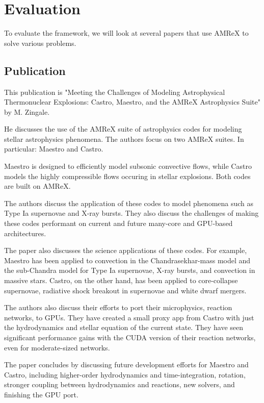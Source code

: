 \documentclass[12pt, a4paper]{scrartcl}
\begin{document}
\section{Evaluation}

To evaluate the framework, we will look at several papers that use AMReX to solve various problems.

\subsection{Publication}

This publication is "Meeting the Challenges of Modeling Astrophysical Thermonuclear Explosions: 
Castro, Maestro, and the AMReX Astrophysics Suite" by M. Zingale.

He discusses the use of the AMReX suite of astrophysics codes for modeling stellar astrophysics phenomena. 
The authors focus on two AMReX suites. In particular: Maestro and Castro.

Maestro is designed to efficiently model subsonic convective flows, while Castro models the highly 
compressible flows occuring in stellar explosions. Both codes are built on AMReX.

The authors discuss the application of these codes to model phenomena such as Type Ia supernovae and X-ray bursts.
They also discuss the challenges of making these codes performant on current and future many-core and GPU-based architectures.

The paper also discusses the science applications of these codes. For example, Maestro has been applied to 
convection in the Chandrasekhar-mass model and the sub-Chandra model for Type Ia 
supernovae, X-ray bursts, and convection in massive stars. 
Castro, on the other hand, has been applied to 
core-collapse supernovae, radiative shock breakout in supernovae and white 
dwarf mergers.

The authors also discuss their efforts to port their microphysics, reaction networks, to GPUs. 
They have created a small proxy app from Castro with just the hydrodynamics and stellar equation 
of the current state. They have seen significant performance gains with the CUDA version of their reaction networks, even 
for moderate-sized networks.

The paper concludes by discussing future development efforts for Maestro and Castro, including higher-order 
hydrodynamics and time-integration, rotation, stronger coupling between hydrodynamics and reactions, new solvers, 
and finishing the GPU port.
\end{document}
